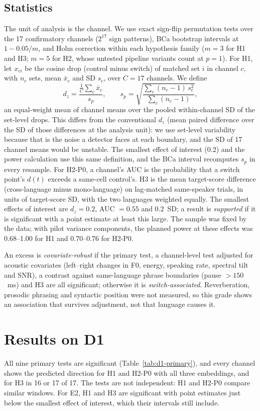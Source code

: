 \documentclass[conference]{IEEEtran}
\begin{document}
\subsection{Statistics}
\label{sec:stats}
The unit of analysis is the channel. We use exact sign-flip permutation tests over the 17
confirmatory channels ($2^{17}$ sign patterns), BCa bootstrap intervals at $1-0.05/m$, and
Holm correction within each hypothesis family ($m=3$ for H1 and H3; $m=5$ for H2, whose
untested pipeline variants count at $p=1$). For H1, let $x_{ci}$ be the cosine drop (control minus switch) of matched set $i$ in channel $c$, with $n_c$ sets, mean $\bar{x}_c$ and SD $s_c$, over $C=17$ channels. We define
\begin{equation}
d_z=\frac{\frac{1}{C}\sum_c \bar{x}_c}{s_p},\qquad
s_p=\sqrt{\frac{\sum_c (n_c-1)\,s_c^2}{\sum_c (n_c-1)}},
\end{equation}
an equal-weight mean of channel means over the pooled within-channel SD of the set-level drops. This differs from the conventional $d_z$ (mean paired difference over the SD of those differences at the analysis unit): we use set-level variability because that is the noise a detector faces at each boundary, and the SD of 17 channel means would be unstable. The smallest effect of interest (0.2) and the power calculation use this same definition, and the BCa interval recomputes $s_p$ in every resample. For H2-P0, a channel's AUC is the probability that a switch point's $d(t)$ exceeds a
same-cell control's. H3 is the mean target-score difference (cross-language minus
mono-language) on lag-matched same-speaker trials, in units of target-score SD, with the two
languages weighted equally. The smallest effects of interest are $d_z=0.2$, AUC $=0.55$ and
0.2~SD; a result is \emph{supported} if it is significant with a point estimate at least this
large. The sample was fixed by the data; with pilot variance components, the planned power at these effects was 0.68--1.00 for H1 and 0.70--0.76 for H2-P0.

An excess is \emph{covariate-robust} if the primary test, a channel-level test adjusted for
acoustic covariates (left--right changes in F0, energy, speaking rate, spectral tilt and
SNR), a contrast against same-language phrase boundaries (pause $>150$~ms) and H3 are all
significant; otherwise it is \emph{switch-associated}. Reverberation, prosodic phrasing and
syntactic position were not measured, so this grade shows an association that survives
adjustment, not that language causes it.

\section{Results on D1}
\label{sec:results}
All nine primary tests are significant (Table~\ref{tab:d1-primary}), and every channel shows
the predicted direction for H1 and H2-P0 with all three embeddings, and for H3 in 16 or 17 of
17. The tests are not independent: H1 and H2-P0 compare similar windows. For E2, H1 and H3
are significant with point estimates just below the smallest effect of interest, which their
intervals still include.
\end{document}
